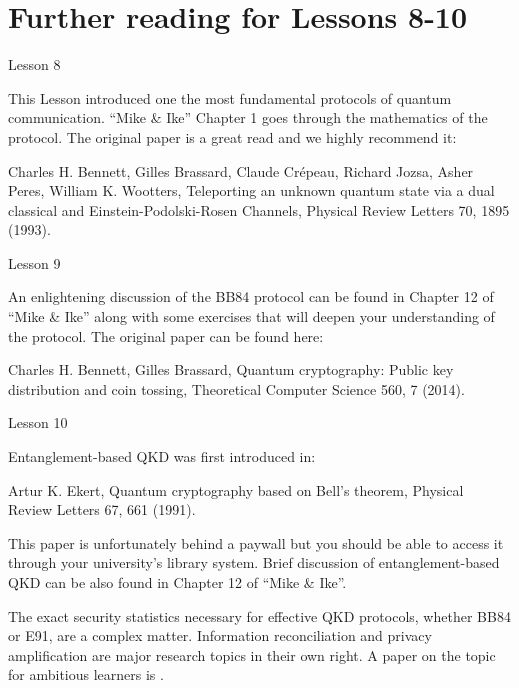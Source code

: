 
\section*{Further reading for Lessons 8-10}

Lesson 8

This Lesson introduced one the most fundamental protocols of quantum communication. “Mike \& Ike” Chapter 1 goes through the mathematics of the protocol. The original paper is a great read and we highly recommend it:

Charles H. Bennett, Gilles Brassard, Claude Crépeau, Richard Jozsa, Asher Peres, William K. Wootters, Teleporting an unknown quantum state via a dual classical and Einstein-Podolski-Rosen Channels, Physical Review Letters 70, 1895 (1993).

Lesson 9

An enlightening discussion of the BB84 protocol can be found in Chapter 12 of “Mike \& Ike” along with some exercises that will deepen your understanding of the protocol.
The original paper can be found here:

Charles H. Bennett, Gilles Brassard, Quantum cryptography: Public key distribution and coin tossing, Theoretical Computer Science 560, 7 (2014).

Lesson 10

Entanglement-based QKD was first introduced in:

Artur K. Ekert, Quantum cryptography based on Bell’s theorem, Physical Review Letters 67, 661 (1991).

This paper is unfortunately behind a paywall but you should be able to access it through your university’s library system.
Brief discussion of entanglement-based QKD can be also found in Chapter 12 of “Mike \& Ike”.

The exact security statistics necessary for effective QKD protocols, whether BB84 or E91, are a complex matter.  Information reconciliation and privacy amplification are major research topics in their own right. A paper on the topic for ambitious learners is .